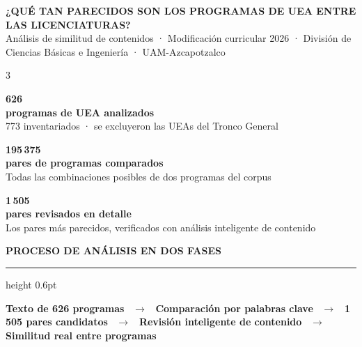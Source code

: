 \documentclass[9pt,a4paper]{article}
\newcommand{\BIGNUM}[1]%
  {{\fontsize{20}{22}\selectfont\ttfamily\bfseries\color{uamred}#1}}
\newcommand{\BIGNUMK}[1]%
  {{\fontsize{20}{22}\selectfont\ttfamily\bfseries\color{paperbg}#1}}
\newcommand{\LBL}[1]{{\small\bfseries\color{paperbg}#1}}
\newcommand{\NOTE}[1]{{\tiny\color{graymid}#1}}
\newcommand{\SECHEAD}[1]{%
  {\fontsize{6}{7}\selectfont\bfseries\color{paperbg}\MakeUppercase{#1}}%
  \par\nointerlineskip\vspace{1pt}%
  {\color{uamred}\hrule height 0.6pt}\par\vspace{3pt}}
\begin{document}

\begin{tcolorbox}[hdr]
{\fontsize{11.5}{13.5}\selectfont\bfseries\color{white}%
 ¿QUÉ TAN PARECIDOS SON LOS PROGRAMAS DE UEA ENTRE LAS LICENCIATURAS?}\\[1pt]
{\small\color{white!60!uamred}%
 Análisis de similitud de contenidos · Modificación curricular 2026 ·
 División de Ciencias Básicas e Ingeniería · UAM-Azcapotzalco}
\end{tcolorbox}

\begin{minipage}[t]{\linewidth}
\begin{multicols}{3}
\begin{tcolorbox}[stat]
\centering
\BIGNUM{626}\\[1pt]
\LBL{programas de UEA analizados}\\[1pt]
\NOTE{773 inventariados · se excluyeron las UEAs del Tronco General}
\end{tcolorbox}
\columnbreak
\begin{tcolorbox}[stat]
\centering
\BIGNUMK{195\,375}\\[1pt]
\LBL{pares de programas comparados}\\[1pt]
\NOTE{Todas las combinaciones posibles de dos programas del corpus}
\end{tcolorbox}
\columnbreak
\begin{tcolorbox}[stat]
\centering
\BIGNUMK{1\,505}\\[1pt]
\LBL{pares revisados en detalle}\\[1pt]
\NOTE{Los pares más parecidos, verificados con análisis inteligente de contenido}
\end{tcolorbox}
\end{multicols}
\end{minipage}

\vspace{3pt}

\begin{tcolorbox}[band]
\SECHEAD{proceso de análisis en dos fases}
\centering\small\color{paperbg}
\textbf{Texto de 626 programas}~%
$\longrightarrow$~%
\textbf{Comparación por palabras clave}~%
$\longrightarrow$~%
\textbf{1\,505 pares candidatos}~%
$\longrightarrow$~%
\textbf{Revisión inteligente de contenido}~%
$\longrightarrow$~%
\textbf{Similitud real entre programas}
\end{tcolorbox}
\end{document}

